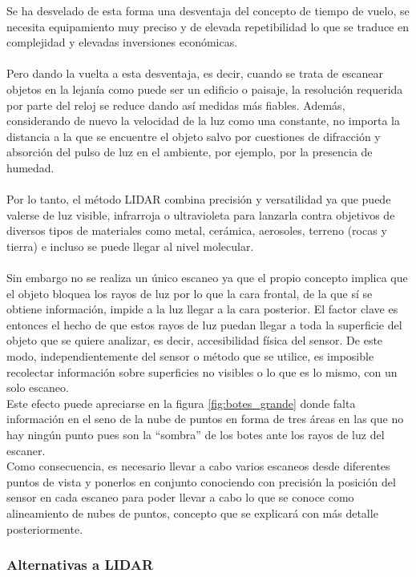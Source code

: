 Se ha desvelado de esta forma una desventaja del concepto de tiempo de vuelo, se necesita equipamiento muy preciso y de elevada repetibilidad lo que se traduce en complejidad y elevadas inversiones económicas.
\\
\\
Pero dando la vuelta a esta desventaja, es decir, cuando se trata de escanear objetos en la lejanía como puede ser un edificio o paisaje, la resolución requerida por parte del reloj se reduce dando así medidas más fiables. Además, considerando de nuevo la velocidad de la luz como una constante, no importa la distancia a la que se encuentre el objeto salvo por cuestiones de difracción y absorción del pulso de luz en el ambiente, por ejemplo, por la presencia de humedad.
\\
\\
Por lo tanto, el método LIDAR combina precisión y versatilidad ya que puede valerse de luz visible, infrarroja o ultravioleta para lanzarla contra objetivos de diversos tipos de materiales como metal, cerámica, aerosoles, terreno (rocas y tierra) e incluso se puede llegar al nivel molecular. 
\\
\\    
Sin embargo no se realiza un único escaneo ya que el propio concepto implica que el objeto bloquea los rayos de luz por lo que la cara frontal, de la que sí se obtiene información, impide a la luz llegar a la cara posterior. El factor clave es entonces el hecho de que estos rayos de luz puedan llegar a toda la superficie del objeto que se quiere analizar, es decir, accesibilidad física del sensor.
De este modo, independientemente del sensor o método que se utilice, es imposible recolectar
información sobre superficies no visibles o lo que es lo mismo, con un solo escaneo.
\\
Este efecto puede apreciarse en la figura \ref{fig:botes_grande} donde falta información en el seno de la nube de puntos en forma de tres áreas en las que no hay ningún punto pues son la ``sombra'' de los botes ante los rayos de luz del escaner.
\\
Como consecuencia, es necesario llevar a cabo varios escaneos desde diferentes puntos de vista y
ponerlos en conjunto conociendo con precisión la posición del sensor en cada escaneo para poder llevar a cabo lo que se conoce como alineamiento de nubes de puntos, concepto que se explicará con más detalle posteriormente.
\fi


\iffalse
\subsubsection{Alternativas a LIDAR}

